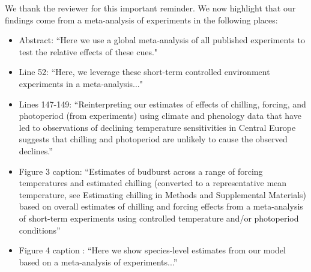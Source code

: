 \documentclass{article}
\begin{document}
\par We thank the reviewer for this important reminder. We now highlight that our findings come from a meta-analysis of experiments in the following places:
\begin{itemize}
\item Abstract: ``Here we use a global meta-analysis of all published experiments to test the relative effects of these cues."
\item Line 52: ``Here, we leverage these short-term controlled environment experiments in a meta-analysis..."
\item Lines 147-149: ``Reinterpreting our estimates of effects of chilling, forcing, and photoperiod (from experiments) using climate and phenology data that have led to observations of declining temperature sensitivities in Central Europe suggests that chilling and photoperiod are unlikely to cause the observed declines.''
\item Figure 3 caption: ``Estimates of budburst across a range of forcing temperatures and estimated chilling (converted to a representative mean temperature, see Estimating chilling in Methods and Supplemental Materials) based on overall estimates of chilling and forcing effects from a meta-analysis
of short-term experiments using controlled temperature and/or photoperiod conditions''
\item Figure 4 caption : ``Here we show species-level estimates from our model based on a meta-analysis of experiments...''
\end{itemize}
\end{document}
